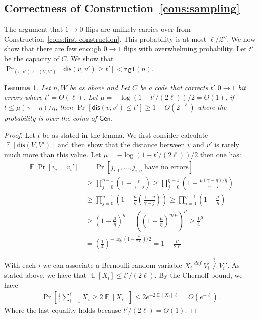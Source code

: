 \documentclass[11pt]{article}
\newcommand{\consref}[1]{\mbox{Construction~\ref{#1}}}
\DeclareMathOperator*{\expe}{\mathbb{E}}
\newcommand{\class}[1]{{\ensuremath{\mathsf{#1}}}}
\newcommand{\gen}{\ensuremath{\class{Gen}}\xspace}
\newcommand{\dis}{\ensuremath{\mathsf{dis}}}
\newcommand{\ngl}{\ensuremath{\mathtt{ngl}}\xspace}
\newtheorem{lemma}[theorem]{Lemma}
\begin{document}
\subsection{Correctness of \consref{cons:sampling}}
The argument that $1\rightarrow 0$ flips are unlikely carries over from \consref{cons:first construction}.  This probability is at most $\ell/\mathcal{Z}^\eta$.  We now show that there are few enough $0\rightarrow 1$ flips with overwhelming probability.  Let $t'$ be the capacity of $C$.  We show that $\Pr_{(v, v')\leftarrow (V, V')}[\dis(v, v')\ge t'] <\ngl(n)$.  

\begin{lemma}
Let $n, W$ be as above and Let $C$ be a code that corrects $t'$ $0\rightarrow 1$ bit errors where $t' =\Theta(\ell)$.  Let $\mu = -\log(1-t'/(2\ell))/2 = \Theta(1)$, if $t \leq \mu(\gamma - \eta)/\eta$, then $\Pr[\dis(v, v')\leq t']\geq 1-O(2^{-\ell})$ where the probability is over the coins of $\gen$.  %
\end{lemma}

\begin{proof}
Let $t$ be as stated in the lemma.
We first consider calculate $\expe[\dis(V, V')]$ and then show that the distance between $v$ and $v'$ is rarely much more than this value.  
Let $\mu = -\log(1-t'/(2\ell))/2$ then one has:
\begin{align*}
\expe \Pr[v_i = v_i'] &=\Pr[j_{i,1},..., j_{i,\eta}\text{ have no errors}]\\
&\geq \prod_{j=0}^{\eta-1}\left(1 - \frac{t}{\gamma-j}\right)\geq \prod_{j=0}^{\eta-1}\left( 1-\frac{\mu(\gamma-\eta)/\eta}{\gamma-i}\right)\\
&\geq  \prod_{j=0}^{\eta-1}\left( 1-\frac{\mu}{\eta}\left(\frac{\gamma-\eta}{\gamma-j}\right)\right)\geq \prod_{j=0}^{\eta-1}\left( 1-\frac{\mu}{\eta}\right) \\
&\geq \left(1-\frac{\mu}{\eta}\right)^{\eta} =\left( \left(1-\frac{\mu}{\eta}\right)^{\eta/\mu}\right)^\mu\geq \frac{1}{4}^\mu\\
& = \left(\frac{1}{4}\right)^{-\log(1-\frac{t'}{2\ell})/2} = 1-\frac{t'}{2\ell}
\end{align*}

With each $i$ we can associate a Bernoulli random variable $X_i \overset{def}= V_i \overset{?}\neq V_i'$.  As stated above, we have that $\expe[X_i] \leq  t'/(2\ell)$. By the Chernoff bound, we have
\begin{align*}
\Pr\left[\frac{1}{\ell} \sum_{i=1}^\ell X_i\geq 2\expe[X_i]\right]\leq 2e^{-2\expe[X_i]\ell} = O(e^{- \ell}).
\end{align*}
Where the last equality holds because $t'/(2\ell) = \Theta(1)$.
\end{proof}
\end{document}
